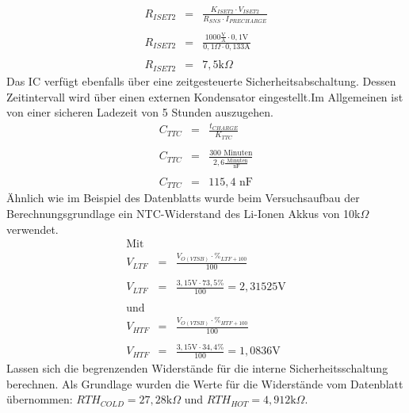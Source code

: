 \documentclass[12pt]{scrreprt} %
\begin{document}
\begin{eqnarray}
R_{ISET2}&=&\frac{K_{ISET2} \cdot V_{ISET2}}{R_{SNS} \cdot I_{PRECHARGE}}\\
 \nonumber \\
R_{ISET2}&=&\frac{1000 \frac{\text{V}}{\text{A}} \cdot 0,1\text{V}}{0,1\Omega \cdot 0,133\text{A}}\\
 \nonumber \\
R_{ISET2}&=&7,5\text{k}\Omega
\end{eqnarray}
Das IC verfügt ebenfalls über eine zeitgesteuerte Sicherheitsabschaltung. Dessen Zeitintervall wird über einen externen Kondensator eingestellt.Im Allgemeinen ist von einer sicheren Ladezeit von 5 Stunden auszugehen. 
\begin{eqnarray}
C_{TTC}&=&\frac{t_{CHARGE}}{K_{TTC}}\\
\nonumber\\
C_{TTC}&=&\frac{300 \text{ Minuten} }{2,6 \frac{\text{ Minuten}}{\text{nF}}}\\
\nonumber\\
C_{TTC}&=& 115,4\text{ nF}
\end{eqnarray}
Ähnlich wie im Beispiel des Datenblatts wurde beim Versuchsaufbau der Berechnungsgrundlage ein NTC-Widerstand des Li-Ionen Akkus von 10k$\Omega$  verwendet.\\
\begin{eqnarray}
\text{Mit }&& \nonumber\\
V_{LTF}&=&\frac{V_{O(VTSB)} \cdot \%_{LTF+100}}{100}\\
\nonumber\\
V_{LTF}&=&\frac{3,15\text{V} \cdot 73,5\%}{100} = 2,31525\text{V}\\
\nonumber\\
\text{und } && \nonumber\\
V_{HTF}&=&\frac{V_{O(VTSB)} \cdot \%_{HTF+100}}{100}\\
\nonumber\\
V_{HTF}&=&\frac{3,15\text{V} \cdot 34,4\%}{100} = 1,0836\text{V}
\end{eqnarray}
Lassen sich die begrenzenden Widerstände für die interne Sicherheitsschaltung berechnen. Als Grundlage wurden die Werte für die Widerstände vom Datenblatt übernommen: $RTH_{COLD} = 27,28\text{k}\Omega$ und $RTH_{HOT} = 4,912\text{k}\Omega$.
\end{document}
